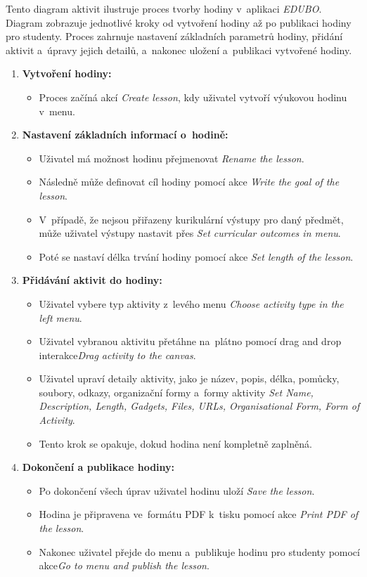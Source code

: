 \documentclass[male,czech,api_bc]{kitheses}
\begin{document}
\newpage

Tento diagram aktivit ilustruje proces tvorby hodiny v~aplikaci \textit{EDUBO}. Diagram zobrazuje jednotlivé kroky od vytvoření hodiny až po publikaci hodiny pro studenty. Proces zahrnuje nastavení základních parametrů hodiny, přidání aktivit a~úpravy jejich detailů, a~nakonec uložení a~publikaci vytvořené hodiny.

\begin{enumerate}
	\item \textbf{Vytvoření hodiny:}
	\begin{itemize}
		\item Proces začíná akcí \textit{Create lesson}, kdy uživatel vytvoří výukovou hodinu v~menu.
	\end{itemize}
	
	\item \textbf{Nastavení základních informací o~hodině:}
	\begin{itemize}
		\item Uživatel má možnost hodinu přejmenovat \textit{Rename the lesson}.
		\item Následně může definovat cíl hodiny pomocí akce \textit{Write the goal of the lesson}.
		\item V~případě, že nejsou přiřazeny kurikulární výstupy pro daný předmět, může uživatel výstupy nastavit přes \textit{Set curricular outcomes in menu}.
		\item Poté se nastaví délka trvání hodiny pomocí akce \textit{Set length of the lesson}.
	\end{itemize}
	
	\item \textbf{Přidávání aktivit do hodiny:}
	\begin{itemize}
		\item Uživatel vybere typ aktivity z~levého menu \textit{Choose activity type in the left menu}.
		\item Uživatel vybranou aktivitu přetáhne na~plátno pomocí drag and drop interakce\break\textit{Drag activity to the canvas}.
		\item Uživatel upraví detaily aktivity, jako je název, popis, délka, pomůcky, soubory, odkazy, organizační formy a~formy aktivity \textit{Set Name, Description, Length, Gadgets, Files, URLs, Organisational Form, Form of Activity}.
		\item Tento krok se opakuje, dokud hodina není kompletně zaplněná.
	\end{itemize}
	
	\item \textbf{Dokončení a publikace hodiny:}
	\begin{itemize}
		\item Po dokončení všech úprav uživatel hodinu uloží \textit{Save the lesson}.
		\item Hodina je připravena ve~formátu PDF k~tisku pomocí akce \textit{Print PDF of the lesson}.
		\item Nakonec uživatel přejde do menu a~publikuje hodinu pro studenty pomocí akce\break\textit{Go to menu and publish the lesson}.
	\end{itemize}
\end{enumerate}
\end{document}
